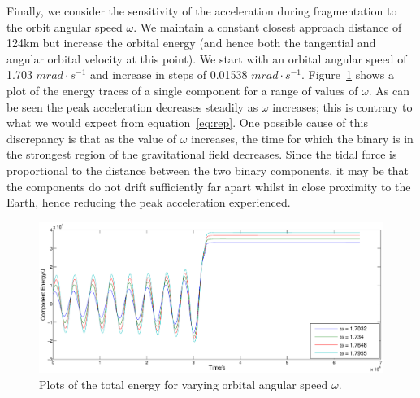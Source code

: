 \documentclass[letterpaper, preprint, paper,11pt]{AAS}	%
\begin{document}
 Finally, we consider the sensitivity of the acceleration during fragmentation to the orbit angular speed $\omega$. We maintain a constant closest approach distance of 124km but increase the orbital energy (and hence both the tangential and angular orbital velocity at this point). We start with an orbital angular speed of 1.703 $mrad \cdot s^{-1}$ and increase in steps of 0.01538 $mrad \cdot s^{-1}$. Figure~\ref{fig:omegasens} shows a plot of the energy traces of a single component for a range of values of $\omega$. As can be seen the peak acceleration decreases steadily as $\omega$ increases; this is contrary to what we would expect from equation~\ref{eq:rep}. One possible cause of this discrepancy is that as the value of $\omega$ increases, the time for which the binary is in the strongest region of the gravitational field decreases. Since the tidal force is proportional to the distance between the two binary components, it may be that the components do not drift sufficiently far apart whilst in close proximity to the Earth, hence reducing the peak acceleration experienced.
\begin{figure}[H]
\centering
\centerline{\includegraphics[width=1.2\textwidth]{omegasens.eps}} 
\caption{Plots of the total energy for varying orbital angular speed $\omega$.} 
\label{fig:omegasens}
\end{figure} 
\end{document}
